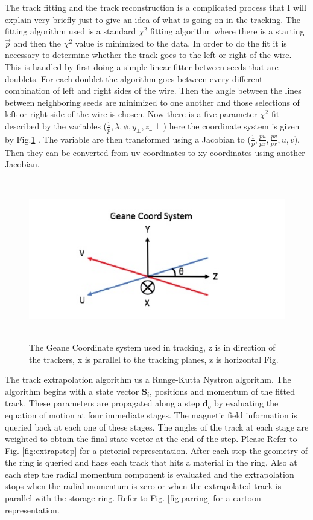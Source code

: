 \documentclass[./Thesis]{subfiles}
\begin{document}
	The track fitting and the track reconstruction is a complicated process that I will explain very briefly just to give an idea of what is going on in the tracking. The fitting algorithm used is a standard $\chi^2$ fitting algorithm where there is a starting $\vec{p}$ and then the $\chi^2$ value is minimized to the data. In order to do the fit it is necessary to determine whether the track goes to the left or right of the wire. This is handled by first doing a simple linear fitter between seeds that are doublets. For each doublet the algorithm goes between every different combination of left and right sides of the wire. Then the angle between the lines between neighboring seeds are minimized to one another and those selections of left or right side of the wire is chosen. Now there is a five parameter $\chi^2$ fit described by the variables ($\frac{1}{p},\lambda,\phi,y_\perp,z\_\perp$) here the coordinate system is given by Fig.\ref{fig:geanecoord} . The variable are then transformed using a Jacobian to ($\frac{1}{p},\frac{pu}{px},\frac{pv}{px},u,v$). Then they can be converted from uv coordinates to xy coordinates using another Jacobian. \cite{nickKin}
	
\begin{figure}
	\centerline{\includegraphics[height=70mm]{GeaneCoord.jpeg}}
	\caption[Geane Coordinate System]{ The Geane Coordinate system used in tracking, z is in direction of the trackers, x is parallel to the tracking planes, z is horizontal Fig.	\cite{nickKin}}
	\label{fig:geanecoord}
\end{figure} 
	
	The track extrapolation algorithm us a Runge-Kutta Nystron algorithm. The algorithm begins with a state vector $\textbf{S}_i$, positions and momentum of the fitted track. These parameters are propagated along a step $\textbf{d}_o$ by evaluating the equation of motion at four immediate stages. The magnetic field information is queried back at each one of these stages. The angles of the track at each stage are weighted to obtain the final state vector at the end of the step. Please Refer to Fig. \ref{fig:extrapstep} for a pictorial representation. After each step the geometry of the ring is queried and flags each track that hits a material in the ring. Also at each step the radial momentum component is evaluated and the extrapolation stops when the radial momentum is zero or when the extrapolated track is parallel with the storage ring. Refer to Fig. \ref{fig:parring} for a cartoon representation. 
	
\end{document}
